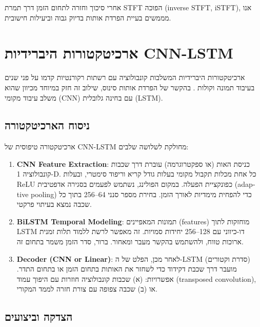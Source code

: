 אחרי סיכוך וחזרה לתחום הזמן דרך תמרת \textenglish{STFT} הפוכה \textenglish{(inverse STFT, iSTFT)}, אנו מממשים בעיית הפרדת אותות בדיוק גבוה וביעילות חישובית.

\section{ארכיטקטורות היברידיות \textenglish{CNN-LSTM}}

ארכיטקטורות היברידיות המשלבות קונבולוציה עם רשתות רקורנטיות קדמו על פני שנים בעיבוד תמונה וקולות \cite{park2024hybrid}. בהקשר של הפרדת אותות סינוס, שילוב זה חזק במיוחד מכיוון שהוא משלב עיבוד מקומי (\textenglish{CNN}) עם בחינה גלובלית (\textenglish{LSTM}).

\subsection{ניסוח הארכיטקטורה}

ארכיטקטורה טיפוסית של \textenglish{CNN-LSTM} מחולקת לשלושה שלבים:

\begin{enumerate}
\item \textenglish{\textbf{CNN Feature Extraction}}: כניסת האות (או ספקטרוגרמה) עוברת דרך שכבות קונבולוציה \textenglish{1-D}. כל אחת מכלות תקבול מקומי בעלות גודל קריא וריפוד סימטרי, ובעלות \textenglish{ReLU} כפונקציית הפעלה. במקום הפולינג, נשתמש לפעמים בסגירה אדפטיבית \textenglish{(adaptive pooling)} כדי להפחית מימדיות לאורך הזמן. בחירת מספר סנני 64--256 בתוך כל שכבה נמצא בעיתוי פרקטי.

\item \textenglish{\textbf{BiLSTM Temporal Modeling}}: תמונות המאפיינים (\textenglish{features}) מוחזקות לתוך \textenglish{LSTM} דו-כיווני עם 128--256 יחידות סמויות. זה מאפשר לרשת ללמוד תלות זמנית ארוכות טווח, ולהשתמש בהקשר מעבר ומאחור. ברור, סדר הזמן משמר בתחום זה.

\item \textenglish{\textbf{Decoder (CNN or Linear)}}: לאחר מכן, הפלט של ה-\textenglish{LSTM} (סדרת וקטורים) מועבר דרך שכבת דקידוד כדי לשחזר את האותות בתחום הזמן או בתחום התדר. אפשרויות: (א) שכבות קונבולוציה חוזרות עם היפוך עמוד (\textenglish{transposed convolution}), או (ב) שכבה צפופה עם צורת חזרה לממד המקורי.
\end{enumerate}

\subsection{הצדקה וביצועים}

